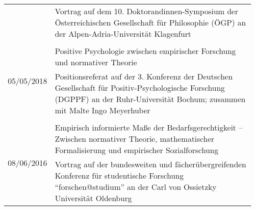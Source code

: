 \documentclass[a4paper,10pt]{article}
\begin{document}
\begin{longtable}{p{2cm}p{}}
& \footnotesize{Vortrag auf dem 10. Doktorandinnen-Symposium der Österreichischen Gesellschaft für Philosophie (ÖGP) an der Alpen-Adria-Universität Klagenfurt}\\
\\
\multirow{2}{2cm}{\footnotesize{05/05/2018}} & Positive Psychologie zwischen empirischer Forschung und normativer Theorie\\
& \footnotesize{Positionsreferat auf der 3. Konferenz der Deutschen Gesellschaft für Positiv-Psychologische Forschung (DGPPF) an der Ruhr-Universität Bochum; zusammen mit Malte Ingo Meyerhuber}\\
\\
\multirow{2}{2cm}{\footnotesize{08/06/2016}} & Empirisch informierte Maße der Bedarfsgerechtigkeit -- Zwischen normativer Theorie, mathematischer Formalisierung und empirischer Sozialforschung\\
& \footnotesize{Vortrag auf der bundesweiten und fächerübergreifenden Konferenz für studentische Forschung \enquote{forschen@studium} an der Carl von Ossietzky Universität Oldenburg}\\
\end{longtable}
\end{document}
